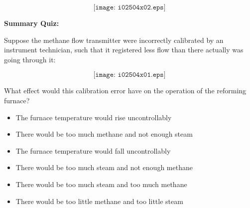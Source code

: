 
$$\texttt{[image: i02504x02.eps]}$$








\vfil \eject

\noindent
{\bf Summary Quiz:}

Suppose the methane flow transmitter were incorrectly calibrated by an instrument technician, such that it registered less flow than there actually was going through it:

$$\texttt{[image: i02504x01.eps]}$$

What effect would this calibration error have on the operation of the reforming furnace?

\begin{itemize}
\item{} The furnace temperature would rise uncontrollably
\vskip 5pt 
\item{} There would be too much methane and not enough steam
\vskip 5pt 
\item{} The furnace temperature would fall uncontrollably
\vskip 5pt 
\item{} There would be too much steam and not enough methane
\vskip 5pt 
\item{} There would be too much steam and too much methane
\vskip 5pt 
\item{} There would be too little methane and too little steam
\end{itemize}






